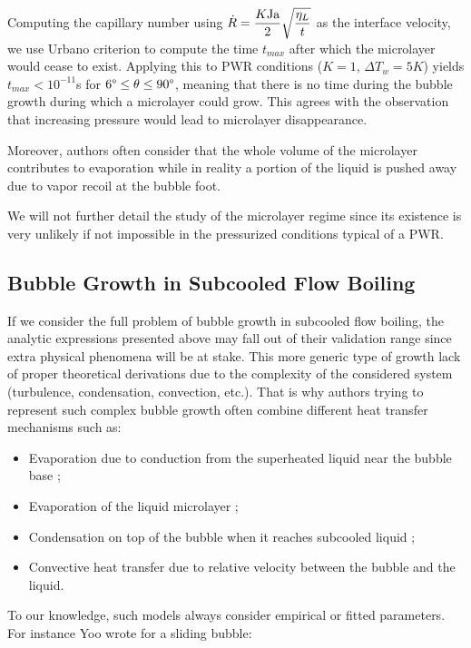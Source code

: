 \begin{remark*}{}
Computing the capillary number using $\dot{R}=\dfrac{K\mathrm{Ja}}{2}\sqrt{\dfrac{\eta_{L}}{t}}$ as the interface velocity, we use Urbano \etal criterion to compute the time $t_{max}$ after which the microlayer would cease to exist. Applying this to PWR conditions ($K=1$, $\Delta T_{w}=5K$) yields $t_{max}<10^{-11}$s for $6\degree \leq \theta \leq 90\degree$, meaning that there is no time during the bubble growth during which a microlayer could grow. This agrees with the observation that increasing pressure would lead to microlayer disappearance.

\npar

Moreover, authors often consider that the whole volume of the microlayer contributes to evaporation while in reality a portion of the liquid is pushed away due to vapor recoil at the bubble foot.
\end{remark*}

We will not further detail the study of the microlayer regime since its existence is very unlikely if not impossible in the pressurized conditions typical of a PWR.


\subsection{Bubble Growth in Subcooled Flow Boiling}


If we consider the full problem of bubble growth in subcooled flow boiling, the analytic expressions presented above may fall out of their validation range since extra physical phenomena will be at stake. This more generic type of growth lack of proper theoretical derivations due to the complexity of the considered system (turbulence, condensation, convection, etc.). That is why authors trying to represent such complex bubble growth often combine different heat transfer mechanisms such as: 

\begin{itemize}
\item Evaporation due to conduction from the superheated liquid near the bubble base ;
\item Evaporation of the liquid microlayer ;
\item Condensation on top of the bubble when it reaches subcooled liquid ;
\item Convective heat transfer due to relative velocity between the bubble and the liquid.
\end{itemize}

To our knowledge, such models always consider empirical or fitted parameters. For instance Yoo \etal \cite{yoo_development_2018} wrote for a sliding bubble:


